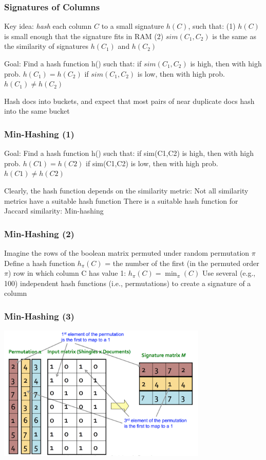 \documentclass[svgnames]{beamer}
\begin{document}
  
\begin{frame} \frametitle{Signatures of Columns}

Key idea: \emph{hash} each column $C$ to a small signature $h(C)$, such that:
  (1) $h(C)$ is small enough that the signature fits in RAM
  (2) $sim(C_1, C_2)$ is the same as the similarity of signatures $h(C_1)$ and $h(C_2)$

Goal: Find a hash function h() such that:
  if $sim(C_1,C_2)$ is high, then with high prob. $h(C_1) = h(C_2)$
  if $sim(C_1,C_2)$ is low, then with high prob. $h(C_1) \neq h(C_2)$

Hash docs into buckets, and expect that most pairs of near duplicate docs hash into the same bucket
\end{frame}

  
\begin{frame} \frametitle{Min-Hashing (1)}

Goal: Find a hash function h() such that:
  if sim(C1,C2) is high, then with high prob. $h(C1) = h(C2)$
  if sim(C1,C2) is low, then with high prob. $h(C1) \neq h(C2)$

Clearly, the hash function depends on the similarity metric:
  Not all similarity metrics have a suitable hash function
  There is a suitable hash function for Jaccard similarity: Min-hashing
  
\end{frame}

  
\begin{frame} \frametitle{Min-Hashing (2)}

Imagine the rows of the boolean matrix permuted under random permutation $\pi$
Define a hash function $h_\pi(C)$ = the number of the first (in the permuted order $\pi$) row in which column C has value 1:
  $h_\pi (C) = \min_\pi(C)$
Use several (e.g., 100) independent hash functions (i.e., permutations) to create a signature of a column

\end{frame}

  
\begin{frame} \frametitle{Min-Hashing (3)}

\includegraphics[width=10cm]{minhash}

\end{frame}
\end{document}
